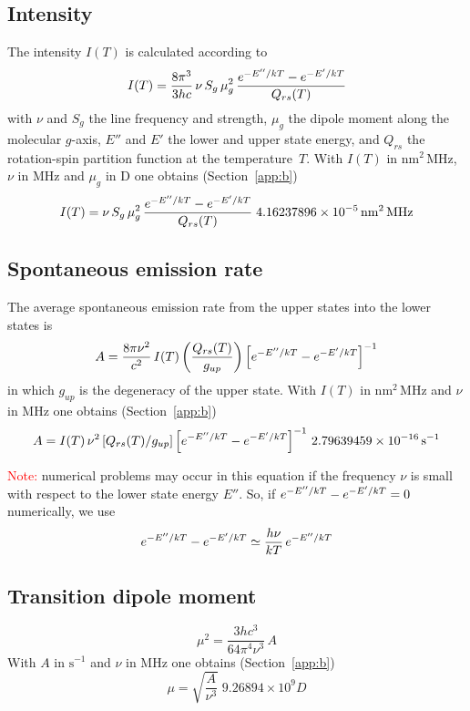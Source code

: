 \subsection{Intensity}
The intensity $I(T)$ is calculated according to
\begin{equation}
  I(T) = \frac{8\pi^3}{3hc}\,\nu\,S_g\,\mu_g^2\,
         \frac{e^{-E''/kT}-e^{-E'/kT}}{Q_{rs}(T)}
\end{equation}
with $\nu$ and $S_g$ the line frequency and strength, $\mu_g$ the dipole moment along the
molecular $g$-axis, $E''$ and $E'$ the lower and upper state energy, and $Q_{rs}$ the
rotation-spin partition function at the temperature~$T$.
With $I(T)$ in $\mathrm{nm^2\,MHz}$, $\nu$ in MHz and $\mu_g$ in D one obtains
(Section~\ref{app:b})
\begin{equation}
  I(T) = \nu\,S_g\,\mu_g^2\,\frac{e^{-E''/kT}-e^{-E'/kT}}{Q_{rs}(T)}\;
         4.16237896\times10^{-5}\,\mathrm{nm^2\,MHz}
\end{equation}

\subsection{Spontaneous emission rate}
The average spontaneous emission rate from the upper states into the lower states is
\begin{equation}
  A = \frac{8\pi\nu^2}{c^2}\,I(T)\left(\frac{Q_{rs}(T)}{g_{up}}\right)
      \left[e^{-E''/kT}-e^{-E'/kT}\right]^{-1}
\end{equation}
in which $g_{up}$ is the degeneracy of the upper state.
With $I(T)$ in $\mathrm{nm^2\,MHz}$ and $\nu$ in MHz one obtains (Section~\ref{app:b})
\begin{equation}
  A = I(T)\,\nu^2\left[Q_{rs}(T)/g_{up}\right]
      \left[e^{-E''/kT}-e^{-E'/kT}\right]^{-1}\,2.79639459\times10^{-16}\,\mathrm{s^{-1}}
\end{equation}

\noindent\textcolor{red}{Note:} numerical problems may occur in this equation if the
frequency $\nu$ is small with respect to the lower state energy $E''$. So, if
$e^{-E''/kT}-e^{-E'/kT}=0$ numerically, we use
\begin{equation}
  e^{-E''/kT}-e^{-E'/kT} \simeq \frac{h\nu}{kT}\,e^{-E''/kT}
\end{equation}

\subsection{Transition dipole moment}
\begin{equation}
  \mu^2 = \frac{3hc^3}{64\pi^4\nu^3}\,A
\end{equation}
With $A$ in $\mathrm{s^{-1}}$ and $\nu$ in MHz one obtains (Section~\ref{app:b})
\begin{equation}
  \mu = \sqrt{\frac{A}{\nu^3}}\;9.26894\times10^{9}\unit{D}
\end{equation}

